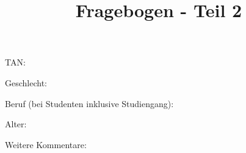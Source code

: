 \documentclass[10pt,a4paper]{scrartcl}
\title{Fragebogen - Teil 2}
\date{\vspace{-5ex}}
\begin{document}
\maketitle
\pagestyle{empty}

\vspace{2 cm}

TAN: \dotfill\\

\vspace{2 cm}

Geschlecht: \dotfill\\

\vspace{2 cm}

Beruf (bei Studenten inklusive Studiengang): \dotfill\\

\vspace{2 cm}

Alter: \dotfill\\

\vspace{2 cm}

Weitere Kommentare: \dotfill\\
\end{document}
